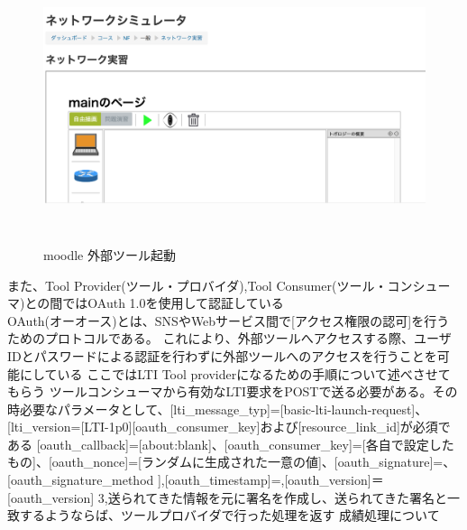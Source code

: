 \begin{figure}[htbp]
  \begin{center}
    \includegraphics[clip,width=12.0cm,height=8.0cm]{img/LTIstart.png}
    \caption{moodle 外部ツール起動}
    \label{fig:moodle kidou}
  \end{center}
\end{figure}
また、Tool Provider(ツール・プロバイダ),Tool Consumer(ツール・コンシューマ)との間ではOAuth 1.0を使用して認証している\\
OAuth(オーオース)とは、SNSやWebサービス間で[アクセス権限の認可]を行うためのプロトコルである。
これにより、外部ツールへアクセスする際、ユーザIDとパスワードによる認証を行わずに外部ツールへのアクセスを行うことを可能にしている
ここではLTI Tool providerになるための手順について述べさせてもらう
ツールコンシューマから有効なLTI要求をPOSTで送る必要がある。その時必要なパラメータとして、[lti_message_typ]=[basic-lti-launch-request]、[lti_version=[LTI-1p0][oauth_consumer_key]および[resource_link_id]が必須である
[oauth_callback]=[about:blank]、[oauth_consumer_key]=[各自で設定したもの]、[oauth_nonce]=[ランダムに生成された一意の値]、[oauth_signature]=、[oauth_signature_method ],[oauth_timestamp]=,[oauth_version]＝[oauth_version]
3,送られてきた情報を元に署名を作成し、送られてきた署名と一致するようならば、ツールプロバイダで行った処理を返す
成績処理について
